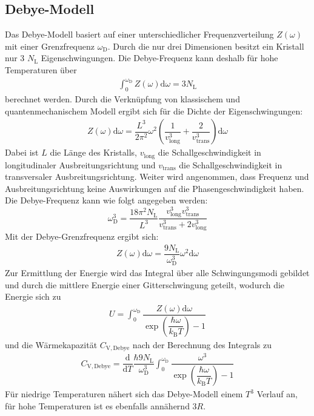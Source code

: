 \subsection{Debye-Modell}
\label{sec:Debby-Modell}
Das Debye-Modell basiert auf einer unterschiedlicher Frequenzverteilung $Z(\omega)$ mit einer Grenzfrequenz $\omega_\mathrm{D}$. Durch die nur drei Dimensionen besitzt ein Kristall nur 3 $N_\mathrm{L}$ Eigenschwingungen. Die Debye-Frequenz kann deshalb für hohe Temperaturen über
\begin{align}
  \label{eqn:Deby-Frequenz}
 \int_{0}^{\omega_\mathrm{D}} Z(\omega) \mathrm{d}\omega = 3N_\mathrm{L}
\end{align}
berechnet werden. Durch die Verknüpfung von klassischem und quantenmechanischem Modell ergibt sich für die Dichte der Eigenschwingungen:
\begin{align}
  \label{eqn:Eigenschwingungen2}
 Z(\omega) \mathrm{d}\omega = \dfrac{L^3}{2\pi^2} \omega^2 \left(\dfrac{1}{v_\mathrm{long}^3}+\dfrac{2}{v_\mathrm{trans}^3}\right) \mathrm{d}\omega
\end{align}
Dabei ist $L$ die Länge des Kristalls, $v_\mathrm{long}$ die Schallgeschwindigkeit in longitudinaler Ausbreitungsrichtung und $v_\mathrm{trans}$ die Schallgeschwindigkeit in transversaler Ausbreitungsrichtung.
Weiter wird angenommen, dass Frequenz und Ausbreitungsrichtung keine Auswirkungen auf die Phasengeschwindigkeit haben.
Die Debye-Frequenz kann wie folgt angegeben werden:
\begin{equation}
  \label{eqn:Eigenschwingungen}
  \omega_\mathrm{D}^3=\dfrac{18\pi^2N_\mathrm{L}}{L^3}\dfrac{v_\mathrm{long}^3v_\mathrm{trans}^3}{v_\mathrm{trans}^3+2v_\mathrm{long}^3}
\end{equation}
Mit der Debye-Grenzfrequenz ergibt sich:
\begin{align}
  \label{eqn:Debby 3}
 Z(\omega) \mathrm{d}\omega = \dfrac{9N_\mathrm{L}}{\omega_\mathrm{D}^3} \omega^2 \mathrm{d}\omega
\end{align}
Zur Ermittlung der Energie wird das Integral über alle Schwingungsmodi gebildet und durch die mittlere Energie einer Gitterschwingung geteilt, wodurch die Energie sich zu
\begin{align}
  \label{eqn:Debye-Energie}
 U = \int_{0}^{\omega_\mathrm{D}} \dfrac{Z(\omega) \mathrm{d}\omega}{\exp\left(\dfrac{\hbar\omega}{k_\mathrm{B}T}\right)-1}
\end{align}
und die Wärmekapazität $C_\mathrm{V,Debye}$ nach der Berechnung des Integrals zu
\begin{align}
  \label{eqn:DebyeWärmekapazität}
 C_\mathrm{V,Debye} = \dfrac{\mathrm{d}}{\mathrm{d}T}  \dfrac{\hbar 9N_\mathrm{L}}{\omega_\mathrm{D}^3} \int_{0}^{\omega_\mathrm{D}} \dfrac{\omega^3}{\exp\left(\dfrac{\hbar\omega}{k_\mathrm{B}T}\right)-1}
\end{align}
Für niedrige Temperaturen nähert sich das Debye-Modell einem $T^3$ Verlauf an, für hohe Temperaturen ist es ebenfalls annähernd $3R$.
